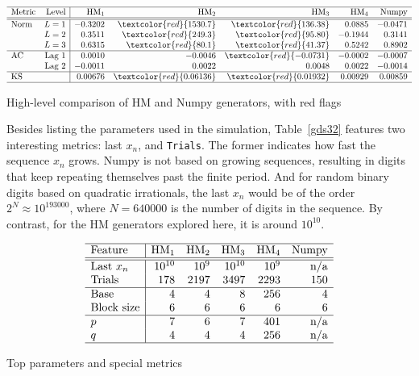 \documentclass[oneside,10pt]{book}
\renewcommand{\arraystretch}{1.4} %
\begin{document}
\begin{table}[H]
\small
\setlength\extrarowheight{-1pt}
\[
\begin{array}{lr|rrrrr}
\hline
\text{Metric}	&	\text{Level}	&	\text{HM}_1	&	\text{HM}_2	&	\text{HM}_3	&	\text{HM}_4	&	\text{Numpy}	\\
\hline
\hline
\text{Norm}	&	L = 1	&	-0.3202	&	\textcolor{red}{1530.7}	&	\textcolor{red}{136.38}	&	0.0885	&	-0.0471	\\
	&	L = 2	&	0.3511	&	\textcolor{red}{249.3}	&	\textcolor{red}{95.80}	&	-0.1944	&	0.3141	\\
	&	L = 3	&	0.6315	&	\textcolor{red}{80.1}	&	\textcolor{red}{41.37}	&	0.5242	&	0.8902	\\
\hline
\text{AC}	&	\text{Lag } 1	&	0.0010	&	-0.0046	&	\textcolor{red}{-0.0731}	&	-0.0002	&	-0.0007	\\
	&	\text{Lag } 2	&	-0.0011	&	0.0022	&	0.0048	&	0.0022	&	-0.0014	\\
\hline
\text{KS}	&		&	0.00676	&	\textcolor{red}{0.06136}	&	\textcolor{red}{0.01932}	&	0.00929	&	0.00859	\\
\hline
\end{array}
\]
\caption{\label{gggtr4}High-level comparison of HM and Numpy generators, with red flags}
\end{table}

Besides listing the parameters used in the simulation, Table~\ref{gds32} features two interesting metrics: last $x_n$, and \texttt{Trials}. The former indicates how fast the
 sequence $x_n$ grows. Numpy is not based on growing sequences, resulting in digits that keep repeating themselves past the finite period. And for random 
binary digits 
 based on quadratic irrationals, the last $x_n$ would be of the order $2^N \approx 10^{\num{193000}}$, where $N = \num{640000}$ is the number of digits in the sequence.
 By contrast, for the HM generators explored here, it is around $10^{10}$.


\begin{table}[H]
\small
\setlength\extrarowheight{-1pt}
\[
\begin{array}{l|rrrrr}
\hline
 \text{Feature} & 	\text{HM}_1	&	\text{HM}_2	&	\text{HM}_3	&	\text{HM}_4	&	\text{Numpy}\\
\hline
\hline
\text{Last } x_n	&	10^{10}	&	10^9	&	10^{10}	&	10^9	&	\text{n/a}	\\
\text{Trials}	&	178	&	2197	&	3497	&	2293	&	150	\\
\hline
\text{Base}	&	4	&	4	&	8	&	256	&	4	\\
\text{Block size}	&	6	&	6	&	6	&	6	&	6	\\
\hline
p	&	7	&	6	&	7	&	401	&	\text{n/a}	\\
q	&	4	&	4	&	4	&	256	&	\text{n/a}	\\
\hline
\end{array}
\]
\caption{\label{gds32}Top parameters and special metrics}
\end{table}
\end{document}
